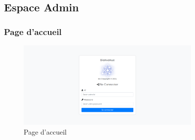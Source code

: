 \documentclass{article}
\begin{document}
        \subsection{Espace Admin}
                    \subsubsection{Page d'accueil}
                        \begin{figure}[h!]
                            \centering
                            \includegraphics[width=0.8\textwidth]{assets/webSite/loginAdmin.png}
                            \caption{Page d'accueil}
                        \end{figure}
                        \FloatBarrier
\end{document}
